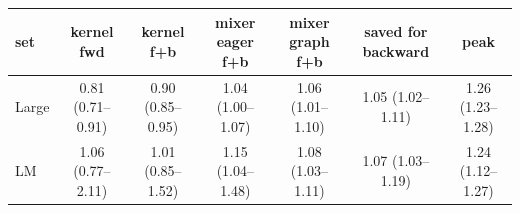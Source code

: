 \begin{tabular}{l c c c c c c }
\toprule
set & kernel fwd & kernel f+b & mixer eager f+b & mixer graph f+b & saved for backward & peak \\
\midrule
Large & 0.81 (0.71--0.91) & 0.90 (0.85--0.95) & 1.04 (1.00--1.07) & 1.06 (1.01--1.10) & 1.05 (1.02--1.11) & 1.26 (1.23--1.28) \\
LM & 1.06 (0.77--2.11) & 1.01 (0.85--1.52) & 1.15 (1.04--1.48) & 1.08 (1.03--1.11) & 1.07 (1.03--1.19) & 1.24 (1.12--1.27) \\
\bottomrule
\end{tabular}

